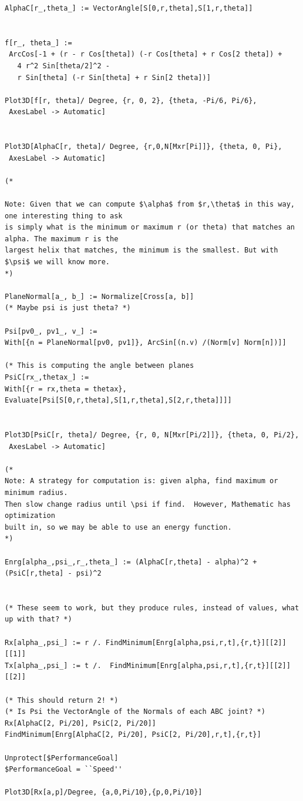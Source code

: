 \documentclass[11pt]{article}
\begin{document}
{\begin{verbatim}
AlphaC[r_,theta_] := VectorAngle[S[0,r,theta],S[1,r,theta]]


f[r_, theta_] := 
 ArcCos[-1 + (r - r Cos[theta]) (-r Cos[theta] + r Cos[2 theta]) + 
   4 r^2 Sin[theta/2]^2 - 
   r Sin[theta] (-r Sin[theta] + r Sin[2 theta])]

Plot3D[f[r, theta]/ Degree, {r, 0, 2}, {theta, -Pi/6, Pi/6}, 
 AxesLabel -> Automatic]


Plot3D[AlphaC[r, theta]/ Degree, {r,0,N[Mxr[Pi]]}, {theta, 0, Pi}, 
 AxesLabel -> Automatic]

(*

Note: Given that we can compute $\alpha$ from $r,\theta$ in this way, one interesting thing to ask
is simply what is the minimum or maximum r (or theta) that matches an alpha. The maximum r is the
largest helix that matches, the minimum is the smallest. But with $\psi$ we will know more.
*)

PlaneNormal[a_, b_] := Normalize[Cross[a, b]]
(* Maybe psi is just theta? *)

Psi[pv0_, pv1_, v_] := 
With[{n = PlaneNormal[pv0, pv1]}, ArcSin[(n.v) /(Norm[v] Norm[n])]]

(* This is computing the angle between planes
PsiC[rx_,thetax_] := 
With[{r = rx,theta = thetax}, Evaluate[Psi[S[0,r,theta],S[1,r,theta],S[2,r,theta]]]]


Plot3D[PsiC[r, theta]/ Degree, {r, 0, N[Mxr[Pi/2]]}, {theta, 0, Pi/2}, 
 AxesLabel -> Automatic]

(*
Note: A strategy for computation is: given alpha, find maximum or minimum radius.
Then slow change radius until \psi if find.  However, Mathematic has optimization
built in, so we may be able to use an energy function.
*)

Enrg[alpha_,psi_,r_,theta_] := (AlphaC[r,theta] - alpha)^2 + (PsiC[r,theta] - psi)^2


(* These seem to work, but they produce rules, instead of values, what up with that? *)

Rx[alpha_,psi_] := r /. FindMinimum[Enrg[alpha,psi,r,t],{r,t}][[2]][[1]]
Tx[alpha_,psi_] := t /.  FindMinimum[Enrg[alpha,psi,r,t],{r,t}][[2]][[2]]

(* This should return 2! *)
(* Is Psi the VectorAngle of the Normals of each ABC joint? *)
Rx[AlphaC[2, Pi/20], PsiC[2, Pi/20]]
FindMinimum[Enrg[AlphaC[2, Pi/20], PsiC[2, Pi/20],r,t],{r,t}]

Unprotect[$PerformanceGoal]
$PerformanceGoal = ``Speed''

Plot3D[Rx[a,p]/Degree, {a,0,Pi/10},{p,0,Pi/10}]


\end{verbatim}}
\end{document}

